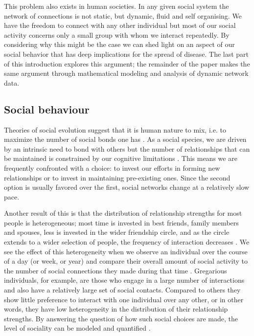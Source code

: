 \documentclass[10pt]{article}
\begin{document}
\begin{multicols}{2}
This problem also exists in human societies. In any given social system the network of connections is not static, but dynamic, fluid and self organising. We have the freedom to connect with any other individual but most of our social activity concerns only a small group with whom we interact repeatedly. By considering why this might be the case we can shed light on an aspect of our social behavior that has deep implications for the spread of disease. The last part of this introduction explores this argument; the remainder of the paper makes the same argument through mathematical modeling and analysis of dynamic network data.

\subsection{Social behaviour}
Theories of social evolution suggest that it is human nature to mix, i.e. to maximize the number of social bonds one has \cite{dunbar2014human}. As a social species, we are driven by an intrinsic need to bond with others but the number of relationships that can be maintained is constrained by our cognitive limitations \cite{dunbar1998social,10.1371/journal.pmed.1000316}. This means we are frequently confronted with a choice: to invest our efforts in forming new relationships or to invest in maintaining pre-existing ones. Since the second option is usually favored over the first, social networks change at a relatively slow pace.
 
Another result of this is that the distribution of relationship strengths for most people is heterogeneous; most time is invested in best friends, family members and spouses, less is invested in the wider friendship circle, and as the circle extends to a wider selection of people, the frequency of interaction decreases \cite{MacCarron2016151,dunbar1998social}. We see the effect of this heterogeneity when we observe an individual over the course of a day (or week, or year) and compare their overall amount of social activity to the number of social connections they made during that time \cite{10.1371/journal.pone.0022656}. Gregarious individuals, for example, are those who engage in a large number of interactions and also have a relatively large set of social contacts. Compared to others they show little preference to interact with one individual over any other, or in other words, they have low heterogeneity in the distribution of their relationship strengths. By answering the question of how such social choices are made, the level of sociality can be modeled and quantified \cite{karsai2014time}.


\end{multicols}
\end{document}
